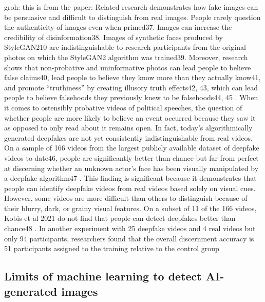 groh: this is from the paper: Related research demonstrates how fake images can be persuasive and difficult to distinguish from real images. People
rarely question the authenticity of images even when primed37. Images can increase the credibility of disinformation38. Images
of synthetic faces produced by StyleGAN210 are indistinguishable to research participants from the original photos on which
the StyleGAN2 algorithm was trained39. Moreover, research shows that non-probative and uninformative photos can lead
people to believe false claims40, lead people to believe they know more than they actually know41, and promote “truthiness” by
creating illusory truth effects42, 43, which can lead people to believe falsehoods they previously knew to be falsehoods44, 45
.
When it comes to ostensibly probative videos of political speeches, the question of whether people are more likely to believe an
event occurred because they saw it as opposed to only read about it remains open.
In fact, today’s algorithmically generated deepfakes are not yet consistently indistinguishable from real videos. On a sample
of 166 videos from the largest publicly available dataset of deepfake videos to date46, people are significantly better than chance
but far from perfect at discerning whether an unknown actor’s face has been visually manipulated by a deepfake algorithm47
.
This finding is significant because it demonstrates that people can identify deepfake videos from real videos based solely on
visual cues. However, some videos are more difficult than others to distinguish because of their blurry, dark, or grainy visual
features. On a subset of 11 of the 166 videos, Kobis et al 2021 do not find that people can detect deepfakes better than chance48
.
In another experiment with 25 deepfake videos and 4 real videos but only 94 participants, researchers found that the
overall discernment accuracy is 51%
participants assigned to the training relative to the control group





\iffalse
\subsection{Limits of machine learning to detect AI-generated images}


